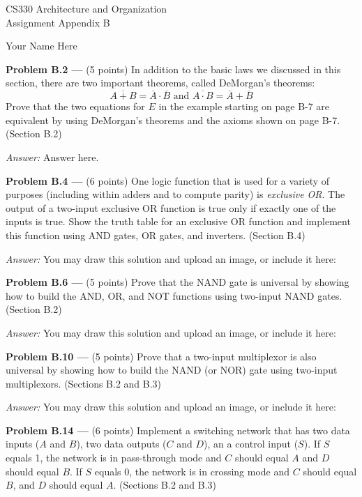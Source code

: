 \documentclass[11pt]{article}
\newcommand{\problem}[1]{\textbf{Problem #1 ---} }
\newcommand{\answer}{{\color{red}\textit{Answer: }}}
\begin{document}
\thispagestyle{empty}

\begin{center}
{\large CS330 Architecture and Organization}\\
Assignment Appendix B
\end{center}

\begin{flushright}
Your Name Here %
\end{flushright}

\problem{B.2}(5 points) In addition to the basic laws we discussed in this section, there are two important theorems, called DeMorgan's theorems:
\[ \overline{A+B} = \overline{A}\cdot\overline{B} \text{ and } \overline{A\cdot B}=\overline{A}+\overline{B} \]
Prove that the two equations for $E$ in the example starting on page B-7 are equivalent by using DeMorgan's theorems and the axioms shown on page B-7. (Section B.2)

\answer
Answer here.

\problem{B.4}(6 points) One logic function that is used for a variety of purposes (including within adders and to compute parity) is \textit{exclusive OR}.  The output of a two-input exclusive OR function is true only if exactly one of the inputs is true.  Show the truth table for an exclusive OR function and implement this function using AND gates, OR gates, and inverters. (Section B.4)

\answer
You may draw this solution and upload an image, or include it here:

\problem{B.6}(5 points) Prove that the NAND gate is universal by showing how to build the AND, OR, and NOT functions using two-input NAND gates. (Section B.2)

\answer
You may draw this solution and upload an image, or include it here:

\problem{B.10}(5 points) Prove that a two-input multiplexor is also universal by showing how to build the NAND (or NOR) gate using two-input multiplexors. (Sections B.2 and B.3)

\answer
You may draw this solution and upload an image, or include it here:


\problem{B.14}(6 points) Implement a switching network that has two data inputs ($A$ and $B$), two data outputs ($C$ and $D$), an a control input ($S$).  If $S$ equals 1, the network is in pass-through mode and $C$ should equal $A$ and $D$ should equal $B$.  If $S$ equals $0$, the network is in crossing mode and $C$ should equal $B$, and $D$ should equal $A$. (Sections B.2 and B.3)
\end{document}
